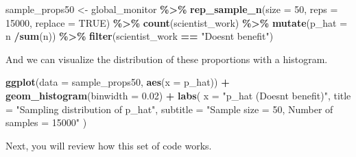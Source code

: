 \documentclass[
]{article}
\newenvironment{Shaded}{\begin{snugshade}}{\end{snugshade}}
\newcommand{\AttributeTok}[1]{\textcolor[rgb]{0.13,0.29,0.53}{#1}}
\newcommand{\ConstantTok}[1]{\textcolor[rgb]{0.56,0.35,0.01}{#1}}
\newcommand{\DecValTok}[1]{\textcolor[rgb]{0.00,0.00,0.81}{#1}}
\newcommand{\FloatTok}[1]{\textcolor[rgb]{0.00,0.00,0.81}{#1}}
\newcommand{\FunctionTok}[1]{\textcolor[rgb]{0.13,0.29,0.53}{\textbf{#1}}}
\newcommand{\NormalTok}[1]{#1}
\newcommand{\OtherTok}[1]{\textcolor[rgb]{0.56,0.35,0.01}{#1}}
\newcommand{\SpecialCharTok}[1]{\textcolor[rgb]{0.81,0.36,0.00}{\textbf{#1}}}
\newcommand{\StringTok}[1]{\textcolor[rgb]{0.31,0.60,0.02}{#1}}
\begin{document}
\begin{Shaded}
\begin{Highlighting}[]
\NormalTok{sample\_props50 }\OtherTok{\textless{}{-}}\NormalTok{ global\_monitor }\SpecialCharTok{\%\textgreater{}\%}
                    \FunctionTok{rep\_sample\_n}\NormalTok{(}\AttributeTok{size =} \DecValTok{50}\NormalTok{, }\AttributeTok{reps =} \DecValTok{15000}\NormalTok{, }\AttributeTok{replace =} \ConstantTok{TRUE}\NormalTok{) }\SpecialCharTok{\%\textgreater{}\%}
                    \FunctionTok{count}\NormalTok{(scientist\_work) }\SpecialCharTok{\%\textgreater{}\%}
                    \FunctionTok{mutate}\NormalTok{(}\AttributeTok{p\_hat =}\NormalTok{ n }\SpecialCharTok{/}\FunctionTok{sum}\NormalTok{(n)) }\SpecialCharTok{\%\textgreater{}\%}
                    \FunctionTok{filter}\NormalTok{(scientist\_work }\SpecialCharTok{==} \StringTok{"Doesn\textquotesingle{}t benefit"}\NormalTok{)}
\end{Highlighting}
\end{Shaded}

And we can visualize the distribution of these proportions with a
histogram.

\begin{Shaded}
\begin{Highlighting}[]
\FunctionTok{ggplot}\NormalTok{(}\AttributeTok{data =}\NormalTok{ sample\_props50, }\FunctionTok{aes}\NormalTok{(}\AttributeTok{x =}\NormalTok{ p\_hat)) }\SpecialCharTok{+}
  \FunctionTok{geom\_histogram}\NormalTok{(}\AttributeTok{binwidth =} \FloatTok{0.02}\NormalTok{) }\SpecialCharTok{+}
  \FunctionTok{labs}\NormalTok{(}
    \AttributeTok{x =} \StringTok{"p\_hat (Doesn\textquotesingle{}t benefit)"}\NormalTok{,}
    \AttributeTok{title =} \StringTok{"Sampling distribution of p\_hat"}\NormalTok{,}
    \AttributeTok{subtitle =} \StringTok{"Sample size = 50, Number of samples = 15000"}
\NormalTok{  )}
\end{Highlighting}
\end{Shaded}

Next, you will review how this set of code works.
\end{document}
